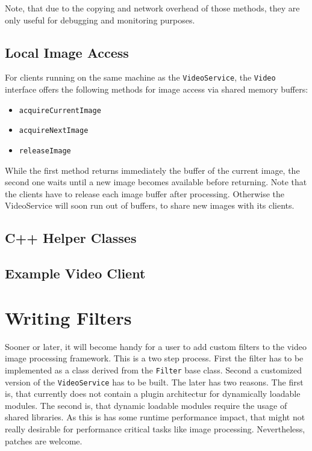 Note, that due to the copying and network overhead of those methods,
they are only useful for debugging and monitoring purposes.

\subsection{Local Image Access}

For clients running on the same machine as the {\tt VideoService}, the
{\tt Video} interface offers the following methods for image access
via shared memory buffers:
\begin{itemize}
\item {\tt acquireCurrentImage}
\item {\tt acquireNextImage}
\item {\tt releaseImage}
\end{itemize}
While the first method returns immediately the buffer of the current
image, the second one waits until a new image becomes available before
returning. Note that the clients have to release each image buffer
after processing. Otherwise the VideoService will soon run out of
buffers, to share new images with its clients.

\subsection{C++ Helper Classes}

\subsection{Example Video Client}


\label{lst:VideoExample}

\section{Writing Filters}

Sooner or later, it will become handy for a user to add 
custom filters to the video image processing framework. This is a two
step process. First the filter has to be implemented as a class
derived from the {\tt Filter} base class. Second a customized version
of the {\tt VideoService} has to be built. The later has two
reasons. The first is, that \miro currently does not contain a plugin
architectur for dynamically loadable modules. The second is, that
dynamic loadable modules require the usage of shared libraries. As
this is has some runtime performance impact, that might not really
desirable for performance critical tasks like image
processing. Nevertheless, patches are welcome.

